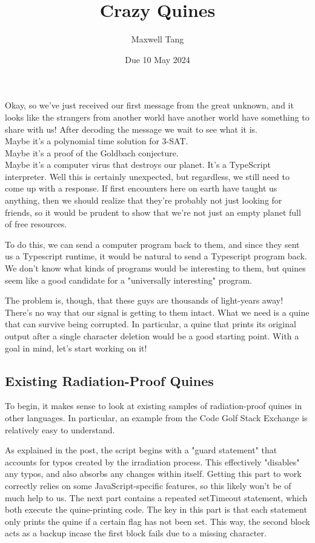 \documentclass{article}
\title{Crazy Quines}
\author{Maxwell Tang}
\date{Due 10 May 2024}
\begin{document}
\maketitle
Okay, so we've just received our first message from the great unknown,
    and it looks like the strangers from another world have another world have something to share with us!
After decoding the message we wait to see what it is. \vspace*{0.25cm}
\\Maybe it's a polynomial time solution for 3-SAT.
\\Maybe it's a proof of the Goldbach conjecture.
\\Maybe it's a computer virus that destroys our planet.
\bigbreak
It's a TypeScript interpreter.
\bigbreak
Well this is certainly unexpected, but regardless, we still need to come up with a response.
If first encounters here on earth have taught us anything,
    then we should realize that they're probably not just looking for friends,
    so it would be prudent to show that we're not just an empty planet full of free resources.

To do this, we can send a computer program back to them,
    and since they sent us a Typescript runtime,
    it would be natural to send a Typescript program back.
We don't know what kinds of programs would be interesting to them,
    but quines seem like a good candidate for a "universally interesting" program.

The problem is, though, that these guys are thousands of light-years away!
There's no way that our signal is getting to them intact.
What we need is a quine that can survive being corrupted.
In particular, a quine that prints its original output after a single character deletion would be a good starting point.
With a goal in mind, let's start working on it!

\subsection*{Existing Radiation-Proof Quines}
To begin, it makes sense to look at existing samples of radiation-proof quines in other languages.
In particular, an example from the Code Golf Stack Exchange is relatively easy to understand.

As explained in the post, the script begins with a "guard statement" that accounts for typos created by the irradiation process.
This effectively "disables" any typos, and also absorbs any changes within itself.
Getting this part to work correctly relies on some JavaScript-specific features, so this likely won't be of much help to us.
The next part contains a repeated setTimeout statement, which both execute the quine-printing code.
The key in this part is that each statement only prints the quine if a certain flag has not been set.
This way, the second block acts as a backup incase the first block fails due to a missing character.
\end{document}
